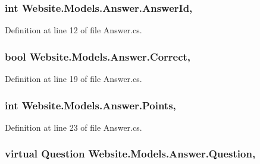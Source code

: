 \subsubsection[{Answer\+Id}]{\setlength{\rightskip}{0pt plus 5cm}int Website.\+Models.\+Answer.\+Answer\+Id\hspace{0.3cm}{\ttfamily [get]}, {\ttfamily [set]}}\label{class_website_1_1_models_1_1_answer_a657d28cbd234fb9145a8b680fe267840}


Definition at line 12 of file Answer.\+cs.

\hypertarget{class_website_1_1_models_1_1_answer_aab18e853c60a076440554b72d05698aa}{}
\subsubsection[{Correct}]{\setlength{\rightskip}{0pt plus 5cm}bool Website.\+Models.\+Answer.\+Correct\hspace{0.3cm}{\ttfamily [get]}, {\ttfamily [set]}}\label{class_website_1_1_models_1_1_answer_aab18e853c60a076440554b72d05698aa}


Definition at line 19 of file Answer.\+cs.

\hypertarget{class_website_1_1_models_1_1_answer_a10b73d42d29df777f4b004fc4ee9c48a}{}
\subsubsection[{Points}]{\setlength{\rightskip}{0pt plus 5cm}int Website.\+Models.\+Answer.\+Points\hspace{0.3cm}{\ttfamily [get]}, {\ttfamily [set]}}\label{class_website_1_1_models_1_1_answer_a10b73d42d29df777f4b004fc4ee9c48a}


Definition at line 23 of file Answer.\+cs.

\hypertarget{class_website_1_1_models_1_1_answer_a985ed3a7b873c20063a9b1e47ddc2c87}{}
\subsubsection[{Question}]{\setlength{\rightskip}{0pt plus 5cm}virtual {\bf Question} Website.\+Models.\+Answer.\+Question\hspace{0.3cm}{\ttfamily [get]}, {\ttfamily [set]}}\label{class_website_1_1_models_1_1_answer_a985ed3a7b873c20063a9b1e47ddc2c87}


